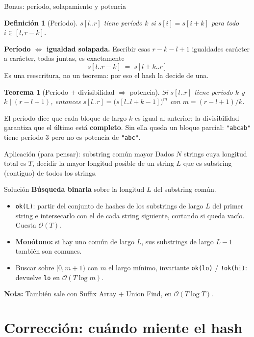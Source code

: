 \documentclass{beamer}
\newtheorem{definicion}{Definición}
\newtheorem{teorema}{Teorema}
\begin{document}
\begin{frame}{Bonus: período, solapamiento y potencia}
\footnotesize
\begin{definicion}[Período]
$s[l..r]$ tiene período $k$ si $s[i] = s[i+k]$ para todo $i \in [l, r-k]$.
\end{definicion}
\textbf{Período $\iff$ igualdad solapada.} Escribir esas $r-k-l+1$ igualdades carácter a carácter, todas juntas, es exactamente
\[ s[l..r{-}k] \;=\; s[l{+}k..r] \]
Es una reescritura, no un teorema: por eso el hash la decide de una.
\begin{teorema}[Período $+$ divisibilidad $\Rightarrow$ potencia]
Si $s[l..r]$ tiene período $k$ y $k \mid (r-l+1)$, entonces $s[l..r] = \big(s[l..l{+}k{-}1]\big)^{m}$ con $m = (r-l+1)/k$.
\end{teorema}
El período dice que cada bloque de largo $k$ es igual al anterior; la divisibilidad garantiza que el último está \textbf{completo}. Sin ella queda un bloque parcial: \texttt{"abcab"} tiene período $3$ pero no es potencia de \texttt{"abc"}.
\end{frame}

\begin{frame}{Aplicación (para pensar): substring común mayor}
Dados $N$ strings cuya longitud total es $T$, decidir la mayor longitud posible de un string $L$ que es substring (contiguo) de todos los strings.
    \pause
\begin{block}{Solución}
\footnotesize
\textbf{Búsqueda binaria} sobre la longitud $L$ del substring común.
\begin{itemize}
    \item \texttt{ok(L)}: partir del conjunto de hashes de los substrings de largo $L$ del primer string e intersecarlo con el de cada string siguiente, cortando si queda vacío. Cuesta $\mathcal{O}(T)$.
    \item \textbf{Monótono:} si hay uno común de largo $L$, sus substrings de largo $L-1$ también son comunes.
    \item Buscar sobre $[0, m+1)$ con $m$ el largo mínimo, invariante \texttt{ok(lo)} / \texttt{!ok(hi)}: devuelve \texttt{lo} en $\mathcal{O}(T \log m)$.
\end{itemize}
\end{block}
\textbf{Nota:} También sale con Suffix Array $+$ Union Find, en $\mathcal{O}(T\log T)$.
\end{frame}

\section{Corrección: cuándo miente el hash}
\end{document}
